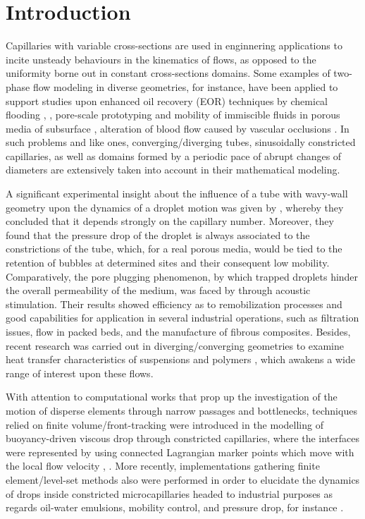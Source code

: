 \documentclass[12pt,fleqn]{article}
\begin{document}
\section{Introduction}

Capillaries with variable cross-sections are used in enginnering
applications to incite unsteady behaviours in the kinematics of flows,
as opposed to the uniformity borne out in constant cross-sections
domains. Some examples of two-phase flow modeling in diverse geometries,
for instance, have been applied to support studies upon enhanced oil
recovery (EOR) techniques by chemical flooding \cite{Olbricht1996},
\cite{Cobos2009}, pore-scale prototyping and mobility of immiscible
fluids in porous media of subsurface \cite{Hemmat1996}, alteration of
blood flow caused by vascular occlusions \cite{Forsester1970}. In such
problems and like ones, converging/diverging tubes, sinusoidally
constricted capillaries, as well as domains formed by a periodic pace of
abrupt changes of diameters are extensively taken into account in their
mathematical modeling.

A significant experimental insight about the influence of a tube with
wavy-wall geometry upon the dynamics of a droplet motion was given by
\cite{OlbrichtAndLeal1983}, whereby they concluded that it depends
strongly on the capillary number. Moreover, they found that the pressure
drop of the droplet is always associated to the constrictions of the
tube, which, for a real porous media, would be tied to the retention of
bubbles at determined sites and their consequent low mobility.
Comparatively, the pore plugging phenomenon, by which trapped droplets
hinder the overall permeability of the medium, was faced by
\cite{Graham2000} through acoustic stimulation. Their results showed
efficiency as to remobilization processes and good capabilities for
application in several industrial operations, such as filtration issues,
flow in packed beds, and the manufacture of fibrous composites. Besides,
recent research was carried out in diverging/converging geometries to
examine heat transfer characteristics of suspensions and polymers
\cite{Narayanam2014}, which awakens a wide range of interest upon these
flows.

With attention to computational works that prop up the investigation of
the motion of disperse elements through narrow passages and bottlenecks,
techniques relied on finite volume/front-tracking were introduced in the
modelling of buoyancy-driven viscous drop through constricted
capillaries, where the interfaces were represented by using connected
Lagrangian marker points which move with the local flow velocity
\cite{MuradogluAndKayaalp2006:In:Olgac2006}, \cite{Olgac2006}. More
recently, implementations gathering finite element/level-set methods
also were performed in order to elucidate the dynamics of drops inside
constricted microcapillaries headed to industrial purposes as regards
oil-water emulsions, mobility control, and pressure drop, for instance
\cite{Roca2013}. 
\end{document}
